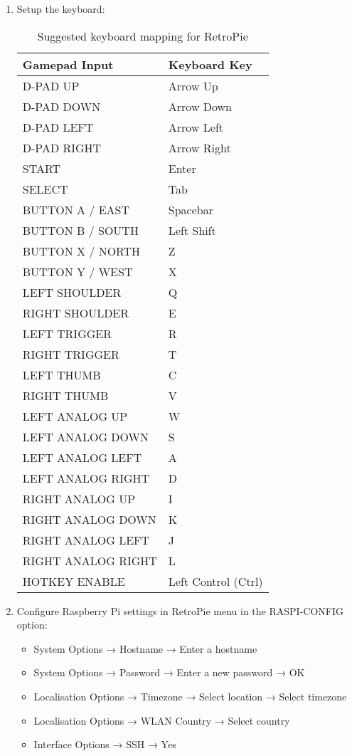 \begin{enumerate}
\item Setup the keyboard:  
\begin{table}[H]
\centering
\begin{tabular}{|l|l|}
\hline
\textbf{Gamepad Input} & \textbf{Keyboard Key} \\
\hline
D-PAD UP & Arrow Up \\
D-PAD DOWN & Arrow Down \\
D-PAD LEFT & Arrow Left \\
D-PAD RIGHT & Arrow Right \\
\hline
START & Enter \\
SELECT & Tab \\
BUTTON A / EAST & Spacebar \\
BUTTON B / SOUTH & Left Shift \\
BUTTON X / NORTH & Z \\
BUTTON Y / WEST & X \\
\hline
LEFT SHOULDER & Q \\
RIGHT SHOULDER & E \\
LEFT TRIGGER & R \\
RIGHT TRIGGER & T \\
LEFT THUMB & C \\
RIGHT THUMB & V \\
\hline
LEFT ANALOG UP & W \\
LEFT ANALOG DOWN & S \\
LEFT ANALOG LEFT & A \\
LEFT ANALOG RIGHT & D \\
RIGHT ANALOG UP & I \\
RIGHT ANALOG DOWN & K \\
RIGHT ANALOG LEFT & J \\
RIGHT ANALOG RIGHT & L \\
\hline
HOTKEY ENABLE & Left Control (Ctrl) \\
\hline
\end{tabular}
\caption{Suggested keyboard mapping for RetroPie}
\end{table}

\item Configure Raspberry Pi settings in RetroPie menu in the RASPI-CONFIG option:
\begin{itemize}
\item System Options → Hostname → Enter a hostname
\item System Options → Password → Enter a new password → OK
\item Localisation Options → Timezone → Select location → Select timezone
\item Localisation Options → WLAN Country → Select country
\item Interface Options → SSH → Yes
\end{itemize}


\end{enumerate}
